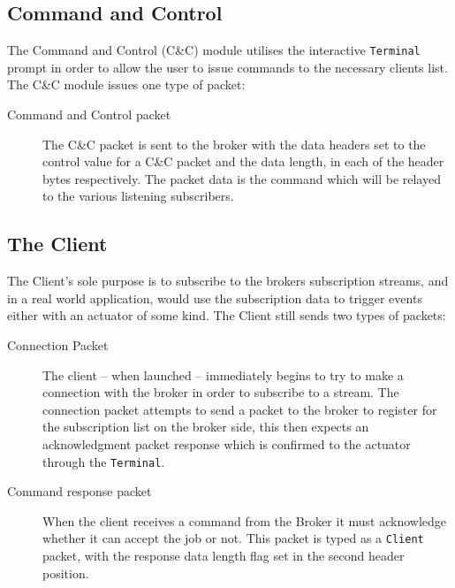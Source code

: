 \documentclass{article}
\newcommand{\code}[1]{\colorbox{light-gray}{\texttt{#1}}}
\begin{document}
    \subsection{Command and Control}
    \label{subsec:C&C}
    The Command and Control (C\&C) module utilises the interactive \code{Terminal} prompt in order to allow the user to issue commands to the necessary clients list. The C\&C module issues one type of packet: 
    \begin{description}
        \item[Command and Control packet] The C\&C packet is sent to the broker with the data headers set to the control value for a C\&C packet and the data length, in each of the header bytes respectively. The packet data is the command which will be relayed to the various listening subscribers.
    \end{description}
    
    \subsection{The Client}
    \label{subsec:Client}
    The Client's sole purpose is to subscribe to the brokers subscription streams, and in a real world application, would use the subscription data to trigger events either with an actuator of some kind. The Client still sends two types of packets:
    \begin{description}
        \item[Connection Packet] The client -- when launched -- immediately begins to try to make a connection with the broker in order to subscribe to a stream. The connection packet attempts to send a packet to the broker to register for the subscription list on the broker side, this then expects an acknowledgment packet response which is confirmed to the actuator through the \code{Terminal}.
        \item[Command response packet] When the client receives a command from the Broker it must acknowledge whether it can accept the job or not. This packet is typed as a \code{Client} packet, with the response data length flag set in the second header position.
    \end{description}
    
    \newpage
\end{document}
